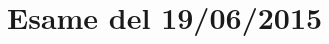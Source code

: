 \documentclass[\main/main.tex]{subfiles}
\begin{document}
\section{Esame del 19/06/2015}

\clearpage

\end{document}
